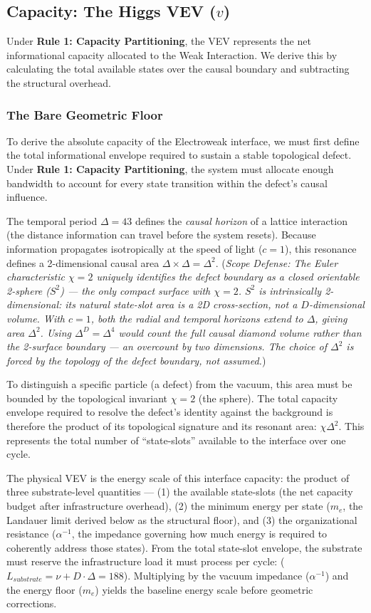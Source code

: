 \subsection{Capacity: The Higgs VEV (\texorpdfstring{$v$}{v})}
Under \textbf{Rule 1: Capacity Partitioning}, the VEV represents the net informational capacity allocated to the Weak Interaction. We derive this by calculating the total available states over the causal boundary and subtracting the structural overhead.

\subsubsection{The Bare Geometric Floor}
To derive the absolute capacity of the Electroweak interface, we must first define the total informational envelope required to sustain a stable topological defect. Under \textbf{Rule 1: Capacity Partitioning}, the system must allocate enough bandwidth to account for every state transition within the defect's causal influence.

The temporal period $\Delta=43$ defines the \textit{causal horizon} of a lattice interaction (the distance information can travel before the system resets). Because information propagates isotropically at the speed of light ($c=1$), this resonance defines a 2-dimensional causal area $\Delta \times \Delta = \Delta^2$. (\textit{Scope Defense: The Euler characteristic $\chi=2$ uniquely identifies the defect boundary as a closed orientable 2-sphere ($S^2$) --- the only compact surface with $\chi=2$. $S^2$ is intrinsically 2-dimensional: its natural state-slot area is a 2D cross-section, not a $D$-dimensional volume. With $c=1$, both the radial and temporal horizons extend to $\Delta$, giving area $\Delta^2$. Using $\Delta^D = \Delta^4$ would count the full causal diamond volume rather than the 2-surface boundary --- an overcount by two dimensions. The choice of $\Delta^2$ is forced by the topology of the defect boundary, not assumed.})

To distinguish a specific particle (a defect) from the vacuum, this area must be bounded by the topological invariant $\chi=2$ (the sphere). The total capacity envelope required to resolve the defect's identity against the background is therefore the product of its topological signature and its resonant area: $\chi \Delta^2$. This represents the total number of ``state-slots'' available to the interface over one cycle.

The physical VEV is the energy scale of this interface capacity: the product of three substrate-level quantities --- (1) the available state-slots (the net capacity budget after infrastructure overhead), (2) the minimum energy per state ($m_e$, the Landauer limit derived below as the structural floor), and (3) the organizational resistance ($\alpha^{-1}$, the impedance governing how much energy is required to coherently address those states). From the total state-slot envelope, the substrate must reserve the infrastructure load it must process per cycle: ($L_{substrate} = \nu + D \cdot \Delta = 188$\cite{meyer_ieaction_2026}). Multiplying by the vacuum impedance ($\alpha^{-1}$) and the energy floor ($m_e$) yields the baseline energy scale before geometric corrections.

